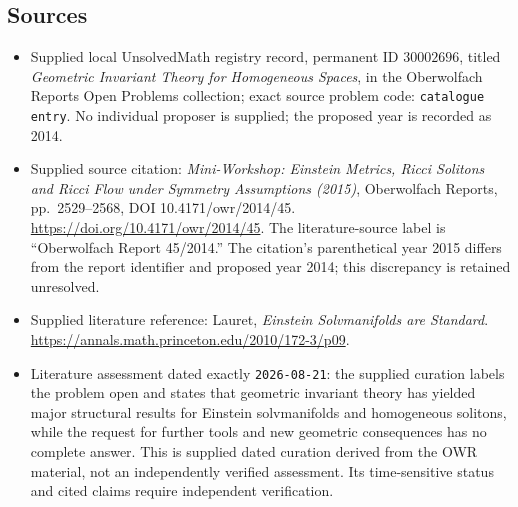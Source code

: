 \documentclass[11pt]{article}
\begin{document}
\subsection{Sources}
\begin{itemize}
\item Supplied local UnsolvedMath registry record, permanent ID \(30002696\), titled \emph{Geometric Invariant Theory for Homogeneous Spaces}, in the Oberwolfach Reports Open Problems collection; exact source problem code: \texttt{catalogue entry}. No individual proposer is supplied; the proposed year is recorded as 2014.
\item Supplied source citation: \emph{Mini-Workshop: Einstein Metrics, Ricci Solitons and Ricci Flow under Symmetry Assumptions (2015)}, Oberwolfach Reports, pp.\ 2529--2568, DOI 10.4171/owr/2014/45. \url{https://doi.org/10.4171/owr/2014/45}. The literature-source label is ``Oberwolfach Report 45/2014.'' The citation's parenthetical year 2015 differs from the report identifier and proposed year 2014; this discrepancy is retained unresolved.
\item Supplied literature reference: Lauret, \emph{Einstein Solvmanifolds are Standard}. \url{https://annals.math.princeton.edu/2010/172-3/p09}.
\item Literature assessment dated exactly \texttt{2026-08-21}: the supplied curation labels the problem open and states that geometric invariant theory has yielded major structural results for Einstein solvmanifolds and homogeneous solitons, while the request for further tools and new geometric consequences has no complete answer. This is supplied dated curation derived from the OWR material, not an independently verified assessment. Its time-sensitive status and cited claims require independent verification.
\end{itemize}
\end{document}
